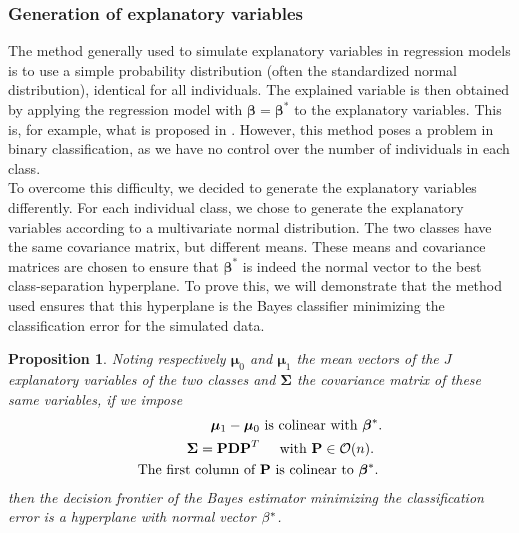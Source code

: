 \documentclass[preprint,12pt]{elsarticle}
\newtheorem{theorem}{Proposition}
\begin{document}
\subsubsection{Generation of explanatory variables}
The method generally used to simulate explanatory variables in regression models is to use a simple probability distribution (often the standardized normal distribution), identical for all individuals. The explained variable is then obtained by applying the regression model with $\bm{\beta} = \bm{\beta}^*$ to the explanatory variables. This is, for example, what is proposed in \cite{picto}. However, this method poses a problem in binary classification, as we have no control over the number of individuals in each class.\\
\indent To overcome this difficulty, we decided to generate the explanatory variables differently. For each individual class, we chose to generate the explanatory variables according to a multivariate normal distribution. The two classes have the same covariance matrix, but different means. These means and covariance matrices are chosen to ensure that $\bm{\beta}^*$ is indeed the normal vector to the best class-separation hyperplane. To prove this, we will demonstrate that the method used ensures that this hyperplane is the Bayes classifier minimizing the classification error for the simulated data.\\
\begin{theorem}
Noting respectively $\bm{\mu}_0$ and $\bm{\mu}_1$ the mean vectors of the $J$ explanatory variables of the two classes and $\bm{\Sigma}$ the covariance matrix of these same variables, if we impose
\begin{align}
    \bm{\mu}_1 - \bm{\mu}_0 & \textnormal{ is colinear with } \bm{\beta}^*.\\
    \bm{\Sigma} = \mathbf{P D P}^T &\hspace{0.5 cm} \textnormal{with } \mathbf{P} \in \mathcal{O}(n).\\
  \textnormal{The first column of }&  \mathbf{P} \textnormal{ is colinear to } \bm{\beta}^*.
\end{align}
\noindent then the decision frontier of the Bayes estimator minimizing the classification error is a hyperplane with normal vector $\bf{\beta}^*$.
\end{theorem}
\end{document}
